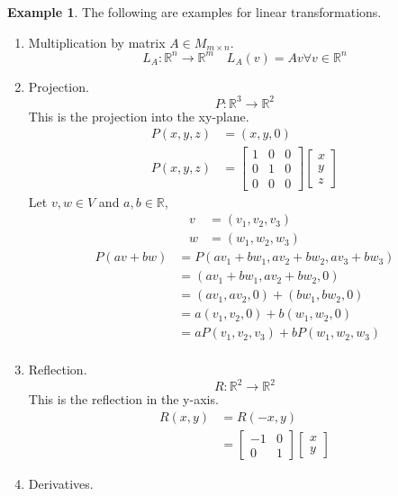 \documentclass{report}
\theoremstyle{definition}
\newtheorem{ex}{Example}[section]
\theoremstyle{remark}
\begin{document}
\begin{ex}
The following are examples for linear transformations.

\begin{enumerate}[1)]
 \item Multiplication by matrix $A\in M_{m\times n}$.
  \[L_A:\mathbb{R}^n\rightarrow\mathbb{R}^m \quad L_A(v)=Av \forall v\in \mathbb{R}^n\]
 \item Projection.
  \[P:\mathbb{R}^3\rightarrow \mathbb{R}^2\]
  This is the projection into the xy-plane.
  \begin{align*}
    P(x,y,z)&=(x,y,0) \\
    P(x,y,z)&=\begin{bmatrix}
    1 & 0 & 0 \\
    0 & 1 & 0 \\
    0 & 0 & 0
    \end{bmatrix}
    \begin{bmatrix}
    x \\ y \\ z
    \end{bmatrix}
  \end{align*}
  Let $v,w\in V$ and $a,b\in \mathbb{R}$,
  \begin{align*}
   v&=(v_1,v_2,v_3) \\
   w&=(w_1,w_2,w_3)
  \end{align*}
  \begin{align*}
  P(av+bw)&=P(av_1+bw_1,av_2+bw_2,av_3+bw_3) \\
  &=(av_1+bw_1,av_2+bw_2,0) \\
  &=(av_1,av_2,0)+(bw_1,bw_2,0) \\
  &=a(v_1,v_2,0)+b(w_1,w_2,0) \\
  &=aP(v_1, v_2, v_3)+bP(w_1,w_2,w_3) \\
  \end{align*}
 \item Reflection.
  \[R:\mathbb{R}^2\rightarrow\mathbb{R}^2\]
  This is the reflection in the y-axis.
  \begin{align*}
   R(x,y)&=R(-x,y) \\
   &=\begin{bmatrix}
   -1 & 0 \\ 0 & 1
   \end{bmatrix}
   \begin{bmatrix}
   x \\ y
   \end{bmatrix}
  \end{align*}
 \item Derivatives.

\end{enumerate}
\end{ex}
\end{document}
